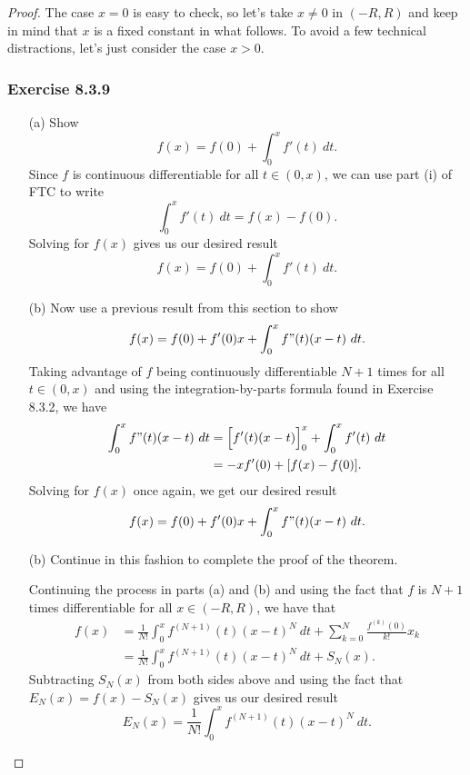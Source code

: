\begin{proof}
The case \( x = 0  \) is easy to check, so let's take \( x \neq 0  \) in \( (-R ,R ) \) and keep in mind that \( x  \) is a fixed constant in what follows. To avoid a few technical distractions, let's just consider the case \( x > 0  \).

\subsubsection{Exercise 8.3.9} 
\begin{enumerate}
    \item[(a)] Show 
        \[  f(x) = f(0) + \int_{ 0 }^{ x }  f'(t) \  dt. \]
            Since \( f  \) is continuous differentiable for all  \( t \in (0,x) \), we can use part (i) of FTC to write 
        \[  \int_{ 0 }^{ x } f'(t)  \ dt =  f(x) - f(0). \] Solving for \( f(x)  \) gives us our desired result 
        \[ f(x) = f(0) + \int_{ 0 }^{ x }  f'(t) \ dt. \]
    \item[(b)] Now use a previous result from this section to show 
        \[  f(x) = f(0) + f'(0) x + \int_{ 0 }^{ x }  f"(t)(x-t) \  dt. \]
            Taking advantage of \( f  \) being continuously differentiable \( N+1  \) times for all \(  t \in (0,x) \) and using the integration-by-parts formula found in Exercise 8.3.2, we have 
            \begin{align*}  \int_{ 0 }^{ x }  f"(t) (x -t ) \  dt &= \Big[ f'(t) (x-t) \Big]_{0}^{x} + \int_{ 0 }^{ x }  f'(t) \  dt \\
            &= -x f'(0) + [ f(x) - f(0)].  
            \end{align*}
            Solving for \( f(x)  \) once again, we get our desired result
        \[  f(x) = f(0) + f'(0) x + \int_{ 0 }^{ x }  f"(t)(x-t) \  dt. \]
    \item[(b)] Continue in this fashion to complete the proof of the theorem.
 
        Continuing the process in parts (a) and (b) and using the fact that \( f  \) is \( N+1  \) times differentiable for all \( x \in (-R ,R ) \), we have that
        \begin{align*}  f(x) &= \frac{ 1 }{ N! }  \int_{ 0 }^{ x  } f^{(N+1)}(t) (x -t )^{N} \  dt + \sum_{ k=0  }^{ N  } \frac{ f^{(k)}(0) }{ k! } x_{k } \\  
            &= \frac{ 1 }{ N! } \int_{ 0 }^{ x }  f^{(N+1)}(t) (x-t)^{N} \   dt + S_{N}(x).
        \end{align*}
        Subtracting \( S_{N}(x)  \) from both sides above and using the fact that \( E_{N}(x) = f(x) - S_{N}(x)  \) gives us our desired result 
    \[  E_{N}(x) = \frac{ 1 }{ N! } \int_{ 0 }^{ x  }  f^{(N+1) }(t) (x-t)^{N} \  dt.  \]
\end{enumerate}
\end{proof}

